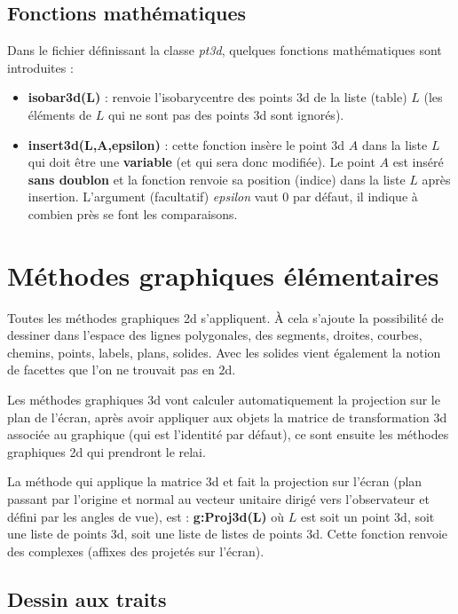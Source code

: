 \subsection{Fonctions mathématiques}

Dans le fichier définissant la classe \emph{pt3d}, quelques fonctions mathématiques sont introduites :
\begin{itemize}
    \item \textbf{isobar3d(L)} : renvoie l'isobarycentre des points 3d de la liste (table) $L$ (les éléments de $L$ qui ne sont pas des points 3d sont ignorés).
    \item \textbf{insert3d(L,A,epsilon)} : cette fonction insère le point 3d $A$ dans la liste $L$ qui doit être une \textbf{variable} (et qui sera donc modifiée). Le point $A$ est inséré \textbf{sans doublon} et la fonction renvoie sa position (indice) dans la liste $L$ après insertion. L'argument (facultatif) \emph{epsilon} vaut $0$ par défaut, il indique à combien près se font les comparaisons.
\end{itemize}

\section{Méthodes graphiques élémentaires}

Toutes les méthodes graphiques 2d s'appliquent. À cela s'ajoute la possibilité de dessiner dans l'espace des lignes polygonales, des segments, droites, courbes, chemins, points, labels, plans, solides. Avec les solides vient également la notion de facettes que l'on ne trouvait pas en 2d.

Les méthodes graphiques 3d vont calculer automatiquement la projection sur le plan de l'écran, après avoir appliquer aux objets la matrice de transformation 3d associée au graphique (qui est l'identité par défaut), ce sont ensuite les méthodes graphiques 2d qui prendront le relai.

La méthode qui applique la matrice 3d et fait la projection sur l'écran (plan passant par l'origine et normal au vecteur unitaire dirigé vers l'observateur et défini par les angles de vue), est : \textbf{g:Proj3d(L)} où $L$ est soit un point 3d, soit une liste de points 3d, soit une liste de listes de points 3d. Cette fonction renvoie des complexes (affixes des projetés sur l'écran).

\subsection{Dessin aux traits}

